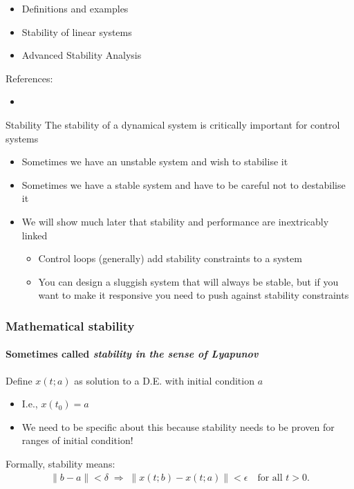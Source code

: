 \documentclass{beamer-control}
\begin{document}

\begin{SUMMARY}
\begin{itemize}
\item Definitions and examples
\item Stability of linear systems
\item Advanced Stability Analysis
\end{itemize}
\vfill References:
\begin{itemize}
\item {}
\end{itemize}
\end{SUMMARY}




\begin{frame}{Stability}
The stability of a dynamical system is critically important for control systems
\begin{itemize}
\item Sometimes we have an unstable system and wish to stabilise it
\item Sometimes we have a stable system and have to be careful not to destabilise it
\item We will show much later that stability and performance are inextricably linked
\begin{itemize}
\item Control loops (generally) add stability constraints to a system
\item You can design a sluggish system that will always be stable, but if you want to make it responsive you need to push against stability constraints
\end{itemize}
\end{itemize}
\end{frame}

\begin{frame}
\frametitle{Mathematical stability}
\framesubtitle{Sometimes called \emph{stability in the sense of Lyapunov}}
Define $x(t;a)$ as solution to a D.E. with initial condition $a$
\begin{itemize}
\item I.e., $x(t_0) = a$
\item We need to be specific about this because stability needs to be proven for ranges of initial condition!
\end{itemize}
Formally, stability means:
\begin{align}
\|b - a\| < \delta \;\Rightarrow\; \|x(t; b) - x(t; a)\| < \epsilon \quad \text{for all } t > 0.
\end{align}
\end{frame}
\end{document}

